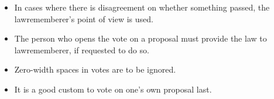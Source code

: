 \documentclass[11pt]{article}
\begin{document}
\begin{itemize}
\item In cases where there is disagreement on whether something passed, the
lawrememberer's point of view is used.
\item The person who opens the vote on a proposal must provide the law to lawrememberer,
if requested to do so.
\item Zero-width spaces in votes are to be ignored.
\item It is a good custom to vote on one's own proposal last.
\end{itemize}
\end{document}
